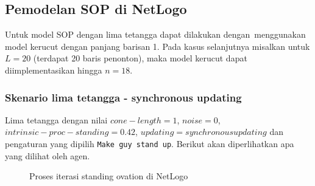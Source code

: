 \subsection{Pemodelan SOP di NetLogo}

Untuk model SOP dengan lima tetangga dapat dilakukan dengan menggunakan model kerucut dengan panjang barisan 1. Pada kasus selanjutnya misalkan untuk $L=20$ (terdapat 20 baris penonton), maka model kerucut dapat diimplementasikan hingga $n=18$.


\subsubsection{Skenario lima tetangga - synchronous updating}

Lima tetangga dengan nilai $cone-length=1$, $noise=0$, $intrinsic-proc-standing=0.42$, $updating=synchronous updating$ dan pengaturan yang dipilih \texttt{Make guy stand up}. Berikut akan diperlihatkan apa yang dilihat oleh agen.

\begin{figure}[H]
	\centering
	\hfill
	\hfill
	\hfill
	\caption{Proses iterasi standing ovation di NetLogo}
	\label{fig:proses_sop}
\end{figure}

